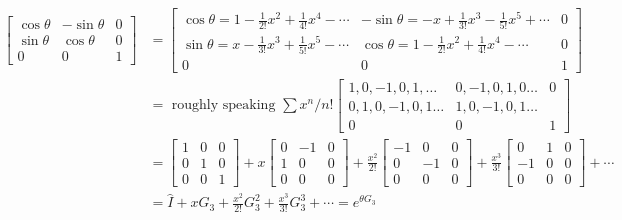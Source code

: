 \documentclass[letterpaper]{article}
\begin{document}
\begin{align*}
	\begin{bmatrix} 
		\cos \theta & - \sin \theta & 0 \\
		\sin \theta & \cos \theta & 0 \\ 
		0 & 0 & 1
	\end{bmatrix} &=
	\begin{bmatrix} 
	\cos \theta = 1 - \frac{1}{2!} x^2 + \frac{1}{4!} x^{4} - \cdots   
	& 
-	\sin \theta = - x + \frac{1}{3!} x^3 - \frac{1}{5!} x^{5} + \cdots 
	&
	0
	\\
		\sin \theta = x - \frac{1}{3!} x^3 + \frac{1}{5!} x^{5} - \cdots & 
		\cos \theta = 1 - \frac{1}{2!} x^2 + \frac{1}{4!} x^{4} - \cdots  & 
0 \\ 
		0 & 0 & 1  
	\end{bmatrix}  \\  
	& = \text{ roughly speaking } 
	\sum x^{n}/n!
	\begin{bmatrix} 
		1,0,-1,0,1, \ldots & 
		0, -1, 0 , 1, 0 \ldots & 0 
		\\
		0, 1, 0, -1, 0, 1 \ldots  & 
		1, 0, -1, 0, 1 \ldots \\ 
		0 & 0 & 1 
	\end{bmatrix}  \\ 
	&= 
	\begin{bmatrix} 1&0&0\\0&1&0\\0&0&1 \end{bmatrix}  + 
	x 
	\begin{bmatrix} 0&-1&0\\1&0&0\\0&0&0 \end{bmatrix}  + 
	\frac{x^2}{2!} 
	\begin{bmatrix} -1&0&0\\0&-1&0\\0&0&0 \end{bmatrix} + 
	\frac{x^3}{3!} 
	\begin{bmatrix} 0&1&0\\-1&0&0\\0&0&0 \end{bmatrix}  + \cdots
	\\ &= 
\hat{I} + x G_3 + \frac{x^2}{2!} G_3^2 + \frac{x^3}{3!} G_3^3 + \cdots
= e^{\theta G_3} 
\end{align*}
\end{document}
